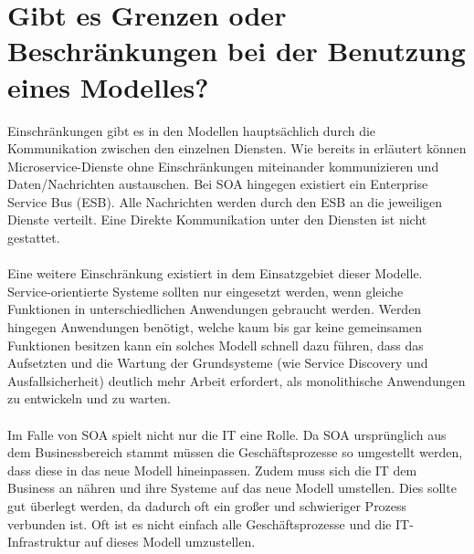 \section{Gibt es Grenzen oder Beschränkungen bei der Benutzung eines Modelles?}
\label{sec:Beschraenkungen}
Einschränkungen gibt es in den Modellen hauptsächlich durch die Kommunikation zwischen den einzelnen Diensten. Wie bereits in  erläutert können Microservice-Dienste ohne Einschränkungen miteinander kommunizieren und Daten/Nachrichten austauschen. Bei SOA hingegen existiert ein Enterprise Service Bus (ESB). Alle Nachrichten werden durch den ESB an die jeweiligen Dienste verteilt. Eine Direkte Kommunikation unter den Diensten ist nicht gestattet.
\\\\
Eine weitere Einschränkung existiert in dem Einsatzgebiet dieser Modelle. Service-orientierte Systeme sollten nur eingesetzt werden, wenn gleiche Funktionen in unterschiedlichen Anwendungen gebraucht werden. Werden hingegen Anwendungen benötigt, welche kaum bis gar keine gemeinsamen Funktionen besitzen kann ein solches Modell schnell dazu führen, dass das Aufsetzten und die Wartung der Grundsysteme (wie Service Discovery und Ausfallsicherheit) deutlich mehr Arbeit erfordert, als monolithische Anwendungen zu entwickeln und zu warten.
\\\\
Im Falle von SOA spielt nicht nur die IT eine Rolle. Da SOA ursprünglich aus dem Businessbereich stammt müssen die Geschäftsprozesse so umgestellt werden, dass diese in das neue Modell hineinpassen. Zudem muss sich die IT dem Business an nähren und ihre Systeme auf das neue Modell umstellen. Dies sollte gut überlegt werden, da dadurch oft ein großer und schwieriger Prozess verbunden ist. Oft ist es nicht einfach alle Geschäftsprozesse und die IT-Infrastruktur auf dieses Modell umzustellen.

